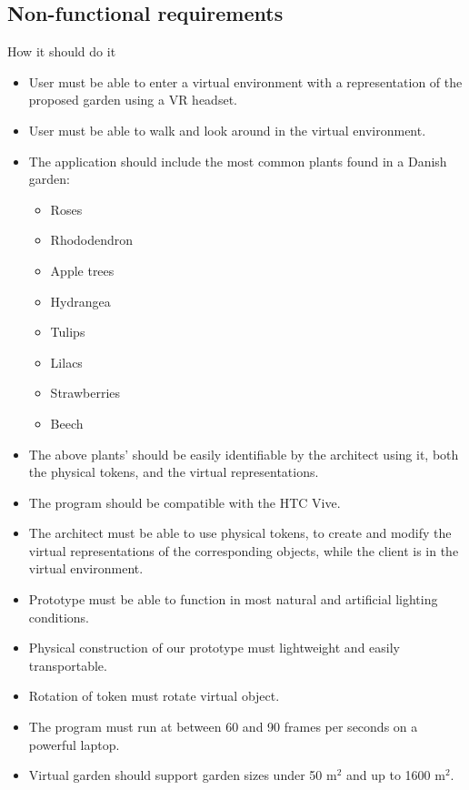 				\subsection{Non-functional requirements}
					How it should do it\\
					\begin{itemize}
						\item User must be able to enter a virtual environment with a representation of the proposed garden using a VR headset.
						\item User must be able to walk and look around in the virtual environment.
						\item The application should include the most common plants found in a Danish garden:
						\begin{itemize}
							\item Roses
							\item Rhododendron
							\item Apple trees
							\item Hydrangea
							\item Tulips
							\item Lilacs
							\item Strawberries
							\item Beech
						\end{itemize}
						\item The above plants' should be easily identifiable by the architect using it, both the physical tokens, and the virtual representations.
						\item The program should be compatible with the HTC Vive.
						\item The architect must be able to use physical tokens, to create and modify the virtual representations of the corresponding objects, while the client is in the virtual environment.
						\item Prototype must be able to function in most natural and artificial lighting conditions.
						\item Physical construction of our prototype must lightweight and easily transportable. 
						\item Rotation of token must rotate virtual object.
						\item The program must run at between 60 and 90 frames per seconds on a powerful laptop.

						\item Virtual garden should support garden sizes under 50 m$^2$ and up to 1600 m$^2$.


\end{itemize}
